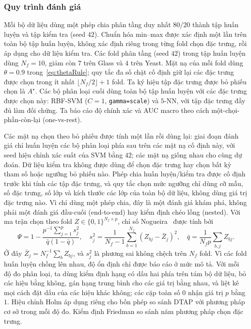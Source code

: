 \subsubsection{Quy trình đánh giá}\label{sssec:protocol}
Mỗi bộ dữ liệu dùng một phép chia phân tầng duy nhất $80/20$ thành tập huấn luyện và tập kiểm tra
(seed $42$). Chuẩn hóa min--max được xác định một lần trên toàn bộ tập huấn luyện, không
xác định riêng trong từng fold chọn đặc trưng, rồi áp dụng cho dữ liệu kiểm tra.
Các fold phân tầng (seed $42$) trong tập huấn luyện dùng $N_f=10$, giảm còn $7$ trên Glass
và $4$ trên Yeast. Mặt nạ của mỗi fold dùng $\theta=0.9$ trong~\eqref{eq:thetaRule};
quy tắc đa số chặt cố định giữ lại các đặc trưng được chọn trong ít nhất
$\lfloor N_f/2\rfloor+1$ fold. Ta ký hiệu tập đặc trưng được bỏ phiếu chọn là $A^\star$. Các bộ phân loại cuối dùng toàn bộ tập huấn luyện với các
đặc trưng được chọn này: RBF-SVM ($C=1$, \texttt{gamma=scale}) và $5$-NN, với tập
đặc trưng đầy đủ làm đối chứng. Ta báo cáo độ chính xác và AUC macro theo cách một-chọi-phần-còn-lại (one-vs-rest).

Các mặt nạ chọn theo bỏ phiếu được tính một lần rồi dùng lại: giai đoạn đánh giá chỉ huấn luyện
các bộ phân loại phía sau trên các mặt nạ cố định này, với seed hiệu chỉnh xác suất của SVM
bằng $42$; các mặt nạ giống nhau cho cùng dự đoán. Dữ liệu kiểm tra không được dùng để chọn đặc trưng hay chọn bất kỳ tham số hoặc ngưỡng bỏ phiếu nào.
Phép chia huấn luyện/kiểm tra được cố định trước khi tính các tập đặc trưng, và quy tắc chọn
mức ngưỡng chỉ dùng cỡ mẫu, số đặc trưng, số lớp
và kích thước các lớp của toàn bộ dữ liệu, không dùng giá trị đặc trưng nào. Vì chỉ dùng một phép chia,
đây là một đánh giá khám phá, không phải một đánh giá đầu-cuối (end-to-end) hay kiểm định chéo lồng (nested).
Với ma trận chọn theo fold $Z\in\{0,1\}^{N_f\times p}$, chỉ số Nogueira~\citep{nogueira2018}
được tính bởi
\[
\Psi=1-\frac{p^{-1}\sum_{j=1}^{p}s_j^2}{\bar q(1-\bar q)},\quad
s_j^2=\frac{1}{N_f-1}\sum_{b=1}^{N_f}(Z_{bj}-\bar Z_j)^2,\quad
\bar q=\frac{1}{N_f p}\sum_{b,j}Z_{bj}.
\]
Ở đây $\bar Z_j=N_f^{-1}\sum_b Z_{bj}$, và $s_j^2$ là phương sai không chệch trên $N_f$
fold.
Vì các fold huấn luyện chồng lên nhau, độ ổn định chỉ được báo cáo ở mức mô tả.
Với mỗi độ đo phân loại, ta dùng kiểm định hạng có dấu hai phía trên
tám bộ dữ liệu, bỏ các hiệu bằng không, gán hạng trung bình cho các giá trị bằng nhau, và
liệt kê mọi cách đặt dấu của các hiệu khác không; các cặp toàn số 0 nhận giá trị $p$ bằng $1$.
Hiệu chỉnh Holm áp dụng riêng cho bốn phép so sánh DTAP với phương pháp cơ sở trong
mỗi độ đo. Kiểm định Friedman so sánh năm phương pháp chọn đặc trưng.

